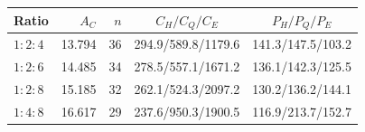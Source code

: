 \begin{tabular*}{\linewidth}{@{\extracolsep{\fill}}lrrcc@{}}\toprule
Ratio & $A_C$ & $n$ & $C_H/C_Q/C_E$ & $P_H/P_Q/P_E$ \\\midrule
$1:2:4$ & 13.794 & 36 & 294.9/589.8/1179.6 & 141.3/147.5/103.2 \\
$1:2:6$ & 14.485 & 34 & 278.5/557.1/1671.2 & 136.1/142.3/125.5 \\
$1:2:8$ & 15.185 & 32 & 262.1/524.3/2097.2 & 130.2/136.2/144.1 \\
$1:4:8$ & 16.617 & 29 & 237.6/950.3/1900.5 & 116.9/213.7/152.7 \\
\bottomrule\end{tabular*}

